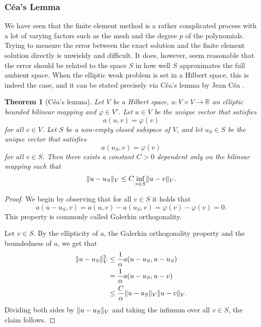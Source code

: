 \documentclass[english, 12pt, a4paper, sci, utf8, a-2b, online]{aaltothesis}
\theoremstyle{definition}
\theoremstyle{plain}
\newtheorem{theorem}{Theorem}[section]
\DeclarePairedDelimiter\norm{\lVert}{\rVert}
\numberwithin{equation}{section}
\begin{document}
\subsubsection{Céa's Lemma}
\label{subsubsec:ceas_lemma}

We have seen that the finite element method is a rather complicated
process with a lot of varying factors such as the mesh and the degree $p$
of the polynomials. Trying to measure the error between the exact solution
and the finite element solution directly is unwieldy and difficult.
It does, however, seem reasonable that the error should be related to the space $S$
in how well $S$ approximates the full ambient space.
When the elliptic weak problem is set in a Hilbert space,
this is indeed the case, and it can be stated precisely via
Céa's lemma by Jean Céa \cite{cea1964}.
\begin{theorem}[Céa's lemma]
    \label{thm:ceas_lemma}
    Let $V$ be a Hilbert space,
    $a: V \times V \to \mathbb{R}$ an elliptic bounded bilinear mapping
    and $\varphi \in V'$.
    Let $u \in V$ be the unique vector that satisfies
    \begin{equation*}
        a(u,v) = \varphi(v)
    \end{equation*}
    for all $v \in V$.
    Let $S$ be a non-empty closed subspace of $V$,
    and let $u_S \in S$ be the unique vector that satisfies
    \begin{equation*}
        a(u_S,v) = \varphi(v)
    \end{equation*}
    for all $v \in S$.
    Then there exists a constant $C > 0$ dependent only on the bilinear mapping
    such that
    \begin{equation*}
        \norm{u - u_S}_V \leq C \inf_{v \in S} \norm{u - v}_V.
    \end{equation*}
\end{theorem}
\begin{proof}
    We begin by observing that for all $v \in S$ it holds that
    \begin{equation*}
        a(u-u_S,v) = a(u,v) - a(u_S,v) = \varphi(v) - \varphi(v) = 0.
    \end{equation*}
    This property is commonly called Galerkin orthogonality.

    Let $v \in S$.
    By the ellipticity of $a$, the Galerkin orthogonality property
    and the boundedness of $a$, we get that
    \begin{align*}
        \norm{u-u_S}_V^2
        &\leq \frac{1}{\alpha} a(u-u_S,u-u_S) \\
        &= \frac{1}{\alpha} a(u-u_S,u-v) \\
        &\leq \frac{C}{\alpha} \norm{u-u_S}_V \norm{u-v}_V.
    \end{align*}
    Dividing both sides by $\norm{u-u_S}_V$
    and taking the infimum over all $v \in S$,
    the claim follows.
\end{proof}
\end{document}
